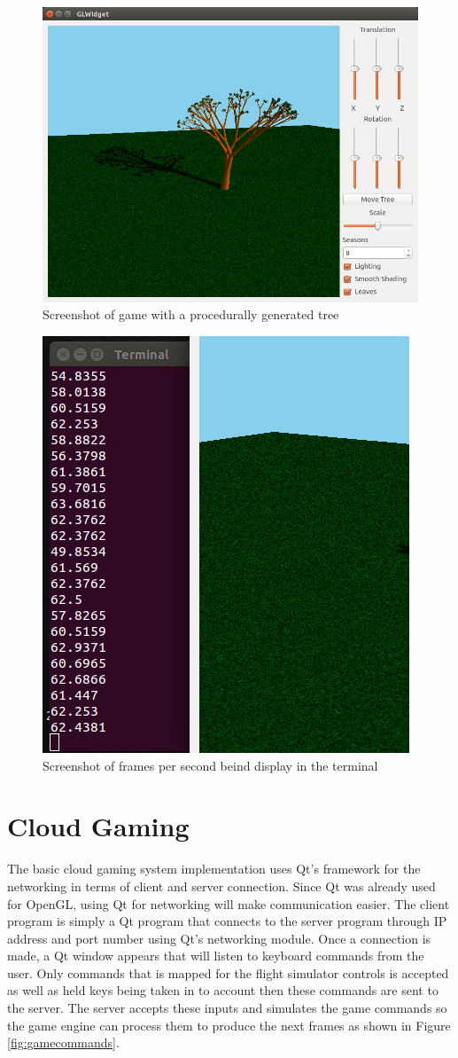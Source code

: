 \begin{figure}[h!]
 \centering
 \includegraphics[width=\linewidth]{images/game.png}
 \caption{Screenshot of game with a procedurally generated tree}
 \label{fig:game}
\end{figure}

\begin{figure}[h!]
 \centering
 \includegraphics[width=0.5\linewidth]{images/gamefps.png}
 \caption{Screenshot of frames per second beind display in the terminal}
 \label{fig:gamefps}
\end{figure}

\section{Cloud Gaming}
The basic cloud gaming system implementation uses Qt's framework for the networking in terms of client and server connection. Since Qt was already used for OpenGL, using Qt for networking will make communication easier. The client program is simply a Qt program that connects to the server program through IP address and port number using Qt's networking module. Once a connection is made, a Qt window appears that will listen to keyboard commands from the user. Only commands that is mapped for the flight simulator controls is accepted as well as held keys being taken in to account then these commands are sent to the server. The server accepts these inputs and simulates the game commands so the game engine can process them to produce the next frames as shown in Figure \ref{fig:gamecommands}.

